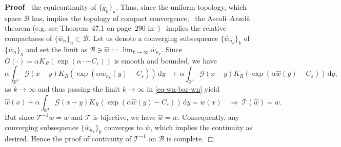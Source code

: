\documentclass{article}
\newcommand{\assign}{:=}
\newcommand{\mathd}{\mathrm{d}}
\newenvironment{proof}{\noindent\textbf{Proof\ }}{\hspace*{\fill}$\Box$\medskip}
\begin{document}
\begin{proof}
  the equicontinuity of $\{ \bar{g}_n \}_n$. Thus, since the uniform topology,
  which space $\mathcal{B}$ has, implies the topology of compact convergence,
  \ the Ascoli--Arzel{\`a} theorem (e.g. see Theorem~47.1 on page~290
  in~{\cite{JM00}}) \ implies the relative compactness of $\{ \bar{w}_n \}_n
  \subset \mathcal{B}$. Let us denote a converging subsequence $\{
  \bar{w}_{n_k} \}_k$ of $\{ \bar{w}_n \}_n$ and set the limit as $\mathcal{B}
  \ni \hat{w} \assign \lim_{k \rightarrow \infty} \bar{w}_{n_k}$. Since $G
  (\cdot) = \alpha K_R (\exp (\alpha \cdot - C_{\varepsilon}))$ is smooth and
  bounded, we have
  \[ 
       \alpha \int_{\mathbb{R}^4} \mathcal{G} (x - y) K_R (\exp (\alpha
       \bar{w}_{n_k} (y) - C_{\varepsilon}))\,  \mathd y ~\rightarrow~ \alpha
       \int_{\mathbb{R}^4} \mathcal{G} (x - y) K_R (\exp (\alpha \hat{w} (y) -
       C_{\varepsilon})) \, \mathd y, \]
  as $k \rightarrow \infty$ and thus passing the limit $k \rightarrow \infty$ in \eqref{eq-wn-bar-wn}
  yield
  \[ 
       \hat{w} (x) + \alpha \int_{\mathbb{R}^4} \mathcal{G} (x - y) K_R (\exp
       (\alpha \hat{w} (y) - C_{\varepsilon})) \, \mathd y = w (x) \quad \Rightarrow~
       \mathcal{T} (\hat{w}) = w.\]
  But since $\mathcal{T}^{- 1} w = \bar{w}$ and $\mathcal{T}$ is bijective, we
  have $\hat{w} = \bar{w} .$ Consequently, any converging subsequence $\{
  \bar{w}_{n_k} \}_k$ converges to $\bar{w}$, which implies the continuity as
  desired. Hence the proof of continuity of $\mathcal{T}^{- 1}$ on
  $\mathcal{B}$ is complete.
\end{proof}
\end{document}
